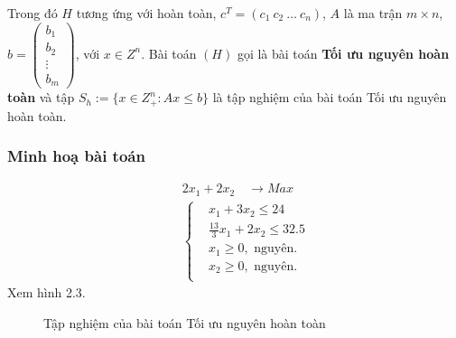 \documentclass[12pt,a4paper]{report}
\begin{document}
    Trong đó $H$ tương ứng với hoàn toàn, $c^T=(c_1 \: c_2 \: \ldots \: c_n)$, $A$ là ma trận $m\times n$, $b=\begin{pmatrix}
        b_1 \\
        b_2 \\
        \vdots \\
        b_m
        \end{pmatrix}$, với $x\in Z^n$. Bài toán $(H)$ gọi là bài toán \textbf{Tối ưu nguyên hoàn toàn} và tập $S_h:=\{x\in Z^n_+: Ax\leq b\}$ là tập nghiệm của bài toán Tối ưu nguyên hoàn toàn.


 \subsubsection*{Minh hoạ bài toán}
    \begin{equation}
        \begin{split}
        \quad & 2x_1 + 2x_2 \quad \longrightarrow Max \\
                    & \left\{\begin{split}
                    & x_1 + 3x_2 \leq 24 \\
                    & \frac{13}{3}x_1 + 2x_2 \leq 32.5 \\
                    &x_1 \geq 0, \text{ nguyên}. \\
                    &x_2 \geq 0, \text{ nguyên}. \\
                    \end{split}\right.    
        \end{split}
        \end{equation}            
Xem hình 2.3.
\begin{figure}
\center
{}  
\caption{Tập nghiệm của bài toán Tối ưu nguyên hoàn toàn}
\end{figure}
\end{document}
